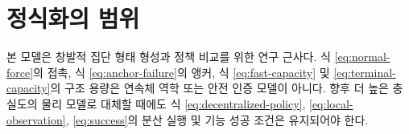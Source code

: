 \documentclass[11pt,a4paper]{article}
\begin{document}
\section{정식화의 범위}

본 모델은 창발적 집단 형태 형성과 정책 비교를 위한 연구 근사다. 식
\eqref{eq:normal-force}의 접촉, 식 \eqref{eq:anchor-failure}의 앵커,
식 \eqref{eq:fast-capacity} 및 \eqref{eq:terminal-capacity}의 구조 용량은
연속체 역학 또는 안전 인증 모델이 아니다. 향후 더 높은 충실도의 물리 모델로
대체할 때에도 식 \eqref{eq:decentralized-policy}, \eqref{eq:local-observation},
\eqref{eq:success}의 분산 실행 및 기능 성공 조건은 유지되어야 한다.
\end{document}
